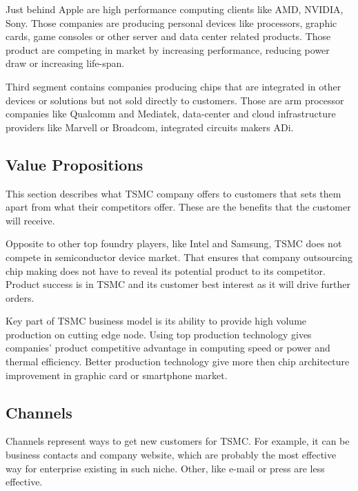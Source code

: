 \documentclass[a4paper,12pt]{article}
\begin{document}
Just behind Apple are high performance computing clients like AMD, NVIDIA, Sony.
Those companies are producing personal devices like processors, graphic cards, game consoles or other server and data center related products. 
Those product are competing in market by increasing performance, reducing power draw or increasing life-span.

Third segment contains companies producing chips that are integrated in other devices or solutions but not sold directly to customers. Those are arm processor companies like Qualcomm and Mediatek, data-center and cloud infrastructure providers like Marvell or Broadcom, integrated circuits makers ADi.


\subsection{Value Propositions}
This section describes what TSMC company offers to customers that sets them apart from what their competitors offer. These are the benefits that the customer will receive.

Opposite to other top foundry players, like Intel and Samsung, TSMC does not compete in semiconductor device market. 
That ensures that company outsourcing chip making does not have to reveal its potential product to its competitor.
Product success is in TSMC and its customer best interest as it will drive further orders. 

Key part of TSMC business model is its ability to provide high volume production on cutting edge node. 
Using top production technology gives companies' product competitive advantage in computing speed or power and thermal efficiency.
Better production technology give more then chip architecture improvement in graphic card or smartphone market. 

\subsection{Channels}
Channels represent ways to get new customers for TSMC. For example, it can be business contacts and company website, which are probably the most effective way for enterprise existing in such niche. Other, like e-mail or press are less effective.
\end{document}
